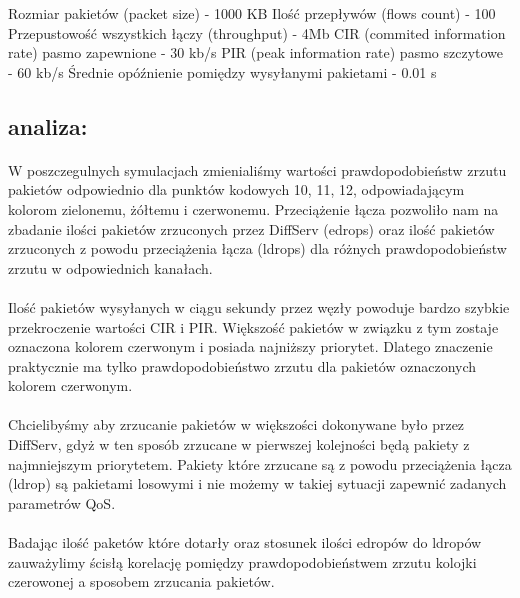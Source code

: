 \documentclass[a4paper]{article}
\begin{document}
Rozmiar pakietów (packet size) - 1000 KB
Ilość przepływów (flows count) - 100
Przepustowość wszystkich łączy (throughput) - 4Mb 
CIR (commited information rate) pasmo zapewnione - 30 kb/s
PIR (peak information rate) pasmo szczytowe - 60 kb/s
Średnie opóźnienie pomiędzy wysyłanymi pakietami - 0.01 s

\subsection{analiza:}

\paragraph{}
W poszczegulnych symulacjach zmienialiśmy wartości prawdopodobieństw zrzutu pakietów odpowiednio dla punktów kodowych 10, 11, 12, odpowiadającym kolorom zielonemu, żółtemu i czerwonemu.
Przeciążenie łącza pozwoliło nam na zbadanie ilości pakietów zrzuconych przez DiffServ (edrops) oraz ilość pakietów zrzuconych z powodu przeciążenia łącza (ldrops) dla różnych prawdopodobieństw zrzutu w odpowiednich kanałach.

\paragraph{}
Ilość pakietów wysyłanych w ciągu sekundy przez węzły powoduje bardzo szybkie przekroczenie wartości CIR i PIR. Większość pakietów w związku z tym zostaje oznaczona kolorem czerwonym i posiada najniższy priorytet. Dlatego znaczenie praktycznie ma tylko prawdopodobieństwo zrzutu dla pakietów oznaczonych kolorem czerwonym. 

\paragraph{}
Chcielibyśmy aby zrzucanie pakietów w większości dokonywane było przez DiffServ, gdyż w ten sposób zrzucane w pierwszej kolejności będą pakiety z najmniejszym priorytetem. Pakiety które zrzucane są z powodu przeciążenia łącza (ldrop) są pakietami losowymi i nie możemy w takiej sytuacji zapewnić zadanych parametrów QoS.

\paragraph{}
Badając ilość paketów które dotarły oraz stosunek ilości edropów do ldropów zauważylimy ścisłą korelację pomiędzy prawdopodobieństwem zrzutu kolojki czerowonej a sposobem zrzucania pakietów.
\end{document}
